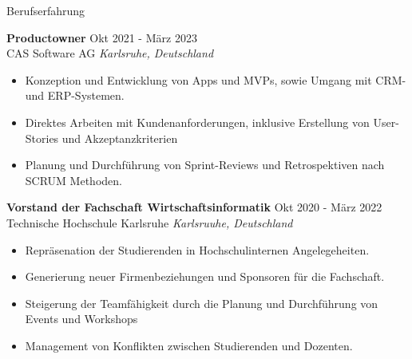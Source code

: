 \documentclass{resume} %
\begin{document}
\vspace{0.5em} %


\begin{rSection}{Berufserfahrung}

    \textbf{Productowner} \hfill Okt 2021 - März 2023\\
    CAS Software AG \hfill \textit{Karlsruhe, Deutschland}
    \begin{itemize}
        \itemsep -3pt {}
        \item \raggedright{Konzeption und Entwicklung von Apps und MVPs, sowie Umgang mit CRM- und ERP-Systemen.}
        \item \raggedright{Direktes Arbeiten mit Kundenanforderungen, inklusive Erstellung von User-Stories und Akzeptanzkriterien}
        \item \raggedright{Planung und Durchführung von Sprint-Reviews und Retrospektiven nach SCRUM Methoden.}
    \end{itemize}

    \textbf{Vorstand der Fachschaft Wirtschaftsinformatik} \hfill Okt 2020 - März 2022\\
    Technische Hochschule Karlsruhe \hfill \textit{Karlsruuhe, Deutschland}
    \begin{itemize}
        \itemsep -3pt {}
        \item \raggedright{Repräsenation der Studierenden in Hochschulinternen Angelegeheiten.}
        \item \raggedright{Generierung neuer Firmenbeziehungen und Sponsoren für die Fachschaft.}
        \item \raggedright{Steigerung der Teamfähigkeit durch die Planung und Durchführung von Events und Workshops}
        \item \raggedright{Management von Konflikten zwischen Studierenden und Dozenten.} 
    \end{itemize}
\end{rSection}

\vspace{0.5em} %

\end{document}
